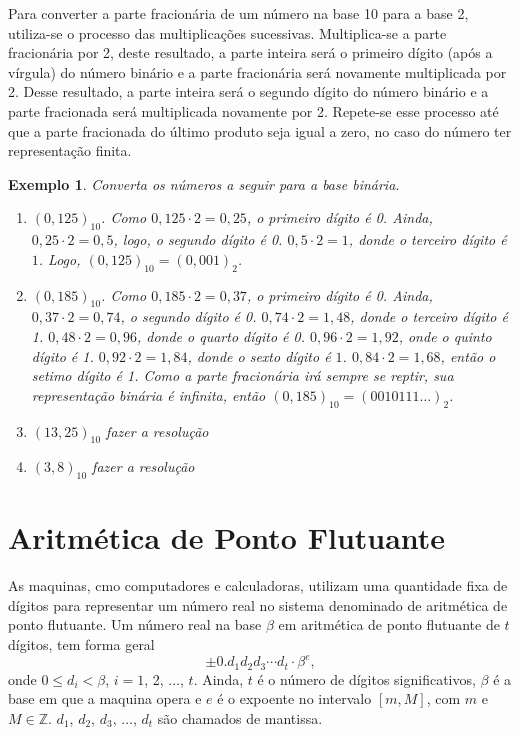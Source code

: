 \documentclass[12pt,a4paper]{book}
\newtheorem{example}{Exemplo}
\newcommand{\todo}[1]{
	{\color{red}#1}
}
\begin{document}
Para converter a parte fracionária de um número na base 10 para a base 2, utiliza-se o processo das multiplicações sucessivas. Multiplica-se a parte fracionária por 2, deste resultado, a parte inteira será o primeiro dígito (após a vírgula) do número binário e a parte fracionária será novamente multiplicada por 2. Desse resultado, a parte inteira será o segundo dígito do número binário e a parte fracionada será multiplicada novamente por 2. Repete-se esse processo até que a parte fracionada do último produto seja igual a zero, no caso do número ter representação finita.

\begin{example}
    Converta os números a seguir para a base binária.
    \begin{enumerate}
        \item $(0,125)_{10}$. Como $0,125\cdot 2 = 0,25$, o primeiro dígito é 0. Ainda, $0,25\cdot 2=0,5$, logo, o segundo dígito é 0. $0,5\cdot 2=1$, donde o terceiro dígito é $1$. Logo, $(0,125)_{10}=(0,001)_{2}$.
        
        \item $(0,185)_{10}$. Como $0,185\cdot 2=0,37$, o primeiro dígito é 0. Ainda, $0,37\cdot 2=0,74$, o segundo dígito é 0. $0,74\cdot 2=1,48$, donde o terceiro dígito é 1. $0,48\cdot 2=0,96$, donde o quarto dígito é 0. $0,96\cdot 2=1,92$, onde o quinto dígito é 1. $0,92\cdot 2=1,84$, donde o sexto dígito é $1$. $0,84\cdot 2=1,68$, então o setimo dígito é 1. Como a parte fracionária irá sempre se reptir, sua representação binária é infinita, então $(0,185)_{10}=(0010111\dots)_{2}$.

        \item $(13,25)_{10}$ \todo{fazer a resolução}

        \item $(3,8)_{10}$ \todo{fazer a resolução}
    \end{enumerate}
\end{example}

\section{Aritmética de Ponto Flutuante}

As maquinas, cmo computadores e calculadoras, utilizam uma quantidade fixa de dígitos para representar um número real no sistema denominado de aritmética de ponto flutuante. Um número real na base $\beta$ em aritmética de ponto flutuante de $t$ dígitos, tem forma geral
$$
    \pm
    0.d_{1}d_{2}d_{3}\cdots d_{t}\cdot \beta ^{e}
    \text{,}
$$
onde $0 \leqslant d_i < \beta$, $i=1$, 2, $\dots$, $t$. Ainda, $t$ é o número de dígitos significativos, $\beta$ é a base em que a maquina opera e $e$ é o expoente no intervalo $[m, M]$, com $m$ e $M \in \mathbb{Z}$. $d_1$, $d_2$, $d_3$, $\dots$, $d_t$ são chamados de mantissa.
\end{document}
